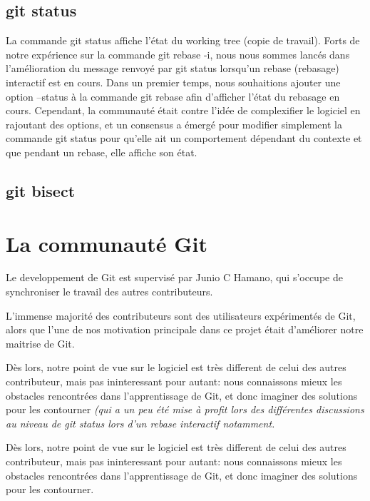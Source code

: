 \documentclass[a4paper, 12pt]{article}
\newcommand{\textremil}[1]{\emph{\color{red} #1}}
\newcommand{\gitcmd}[1]{\emph{#1}}
\newcommand{\tech}[1]{\emph{#1}}
\begin{document}
\subsection{git status}

La commande git status affiche l'état du working tree (copie de travail).
Forts de notre expérience sur la commande git rebase -i, nous nous sommes lancés dans l'amélioration du message renvoyé par git status lorsqu'un rebase (rebasage) interactif est en cours.
Dans un premier temps, nous souhaitions ajouter une option --status à la commande git rebase afin d'afficher l'état du rebasage en cours. 
Cependant, la communauté était contre l'idée de complexifier le logiciel en rajoutant des options, et un consensus a émergé pour modifier simplement la commande git status pour qu'elle ait un comportement dépendant du contexte et que pendant un rebase, elle affiche son état.

\subsection{git bisect}



\section{La communauté Git}

Le developpement de Git est supervisé par Junio C Hamano, qui s'occupe de synchroniser le travail des autres contributeurs.

L'immense majorité des contributeurs sont des utilisateurs expérimentés de Git, alors que l'une de nos motivation principale dans ce projet était d'améliorer notre maitrise de Git.

Dès lors, notre point de vue sur le logiciel est très different de celui des autres contributeur, mais pas ininteressant pour autant: nous connaissons mieux les obstacles rencontrées dans l'apprentissage de Git, et donc imaginer des solutions pour les contourner
\textremil{(qui a un peu été mise à profit lors des différentes discussions au niveau de \gitcmd{git status} lors d'un \tech{rebase interactif} notamment.}

Dès lors, notre point de vue sur le logiciel est très different de celui des autres contributeur, mais pas ininteressant pour autant: nous connaissons mieux les obstacles rencontrées dans l'apprentissage de Git, et donc imaginer des solutions pour les contourner.
~\\
\end{document}
